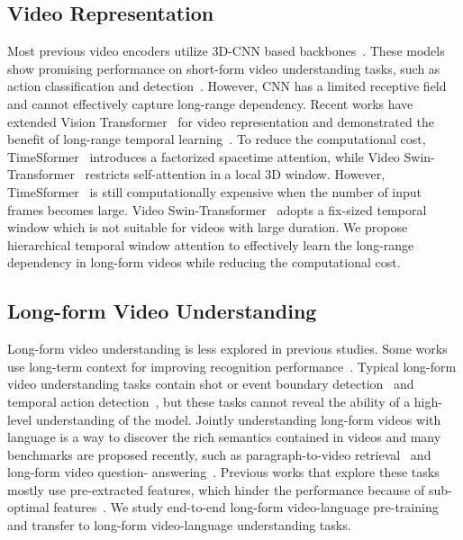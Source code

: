 \documentclass{article}
\begin{document}
\subsection{Video Representation}

Most previous video encoders utilize 3D-CNN based backbones~\cite{carreira2017i3d-k600,tran2015c3d,xie2018s3d}. These models show promising performance on short-form video understanding tasks, such as action classification and detection~\cite{carreira2017i3d-k600,caba2015activitynet,goyal2017something}. However, CNN has a limited receptive field and cannot effectively capture long-range dependency. Recent works have extended Vision Transformer~\cite{dosovitskiy2020vit} for video representation and demonstrated the benefit of long-range temporal learning~\cite{bertasius2021timesformer,liu2021videoswin}. To reduce the computational cost, TimeSformer~\cite{bertasius2021timesformer} introduces a factorized spacetime attention, while Video Swin-Transformer~\cite{liu2021swin} restricts self-attention in a local 3D window. However, TimeSformer~\cite{bertasius2021timesformer} is still computationally expensive when the number of input frames becomes large. Video Swin-Transformer~\cite{liu2021videoswin} adopts a fix-sized temporal window which is not suitable for videos with large duration.
We propose hierarchical temporal window attention to effectively learn the long-range dependency in long-form videos while reducing the computational cost.

\subsection{Long-form Video Understanding}
Long-form video understanding is less explored in previous studies. Some works use long-term context for improving recognition performance~\cite{shvets2019leveraging,wu2019long-feature-bank}.
Typical long-form video understanding tasks contain shot or event boundary detection~\cite{baraldi2015shot-scene} and temporal action detection~\cite{caba2015activitynet}, but these tasks cannot reveal the ability of a high-level understanding of the model.
Jointly understanding long-form videos with language is a way to discover the rich semantics contained in videos and many benchmarks are proposed recently, such as paragraph-to-video retrieval~\cite{anne2017didemo,bain2020cmovie,krishna2017actnetcaption,oncescu2021queryd} and long-form video question- answering~\cite{li2020hero,li2021value,liu2020violin,yu2019activitynetqa}.
Previous works that explore these tasks mostly use pre-extracted features, which hinder the performance because of sub-optimal features~\cite{ging2020coot,li2020hero,zhang2018hse,zhuang2020multichannel-vqa}.
We study end-to-end long-form video-language pre-training and transfer to long-form video-language understanding tasks.
\end{document}

